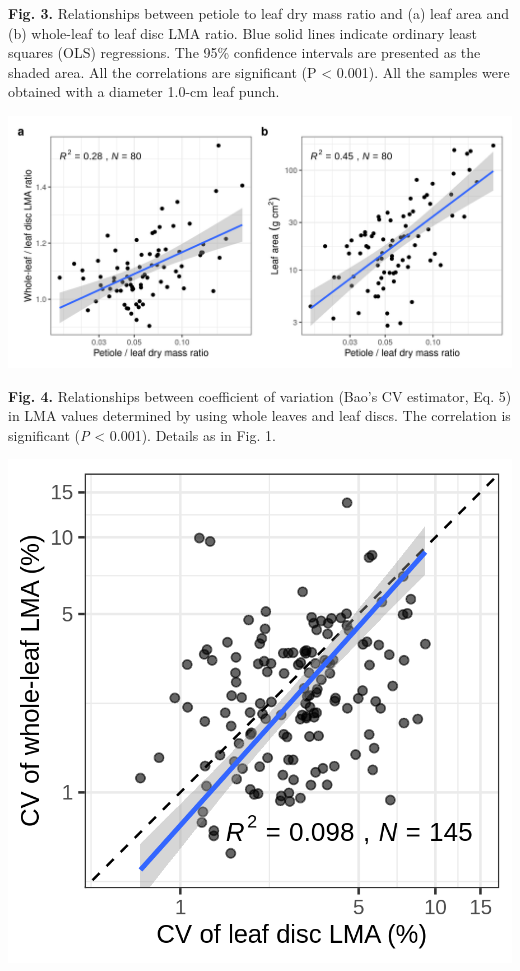 \documentclass[
  12pt,
  a4paper,
,tablecaptionabove
]{scrartcl}
\begin{document}
\newpage

\textbf{Fig. 3.}
Relationships between petiole to leaf dry mass ratio and (a) leaf area and (b) whole-leaf to leaf disc LMA ratio.
Blue solid lines indicate ordinary least squares (OLS) regressions.
The 95\% confidence intervals are presented as the shaded area.
All the correlations are significant (P \textless{} 0.001).
All the samples were obtained with a diameter 1.0-cm leaf punch.

\includegraphics{../figs/petiole.png}

\newpage

\textbf{Fig. 4.}
Relationships between coefficient of variation (Bao's CV estimator, Eq. 5) in LMA values determined by using whole leaves and leaf discs.
The correlation is significant (\emph{P} \textless{} 0.001).
Details as in Fig. 1.

\includegraphics{../figs/cv_pool.png}
\end{document}
